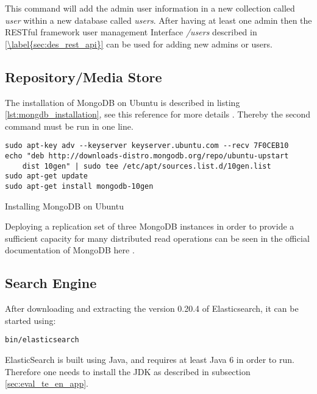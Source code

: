 This command will add the admin user information in a new collection called \textit{user} within a new database called \textit{users}.  After having at least one admin then the RESTful framework user management Interface \textit{/users} described in \ref{\label{sec:des_rest_api}} can be used for adding new admins or users.

\subsection{Repository/Media Store\label{sec:eval_te_en_mongo}}
The installation of MongoDB on Ubuntu is described in listing \ref{lst:mongdb_installation}, see this reference for more details \cite{MongoDb:installation}. Thereby the second command must be run in one line.  
\begin{code}
\begin{verbatim}
sudo apt-key adv --keyserver keyserver.ubuntu.com --recv 7F0CEB10
echo "deb http://downloads-distro.mongodb.org/repo/ubuntu-upstart 
	dist 10gen" | sudo tee /etc/apt/sources.list.d/10gen.list
sudo apt-get update
sudo apt-get install mongodb-10gen
\end{verbatim}
\caption{Installing MongoDB on Ubuntu}
\label{lst:mongdb_installation}
\end{code}

Deploying a replication set of three MongoDB instances in order to provide a sufficient capacity for many distributed read operations can be seen in the official documentation of MongoDB here \cite{mongodb_replica_set}.

\subsection{Search Engine\label{sec:eval_te_se}}
After downloading  and extracting the version 0.20.4 of Elasticsearch, it can be started using:
\begin{code}
\begin{verbatim}
bin/elasticsearch
\end{verbatim}
\end{code}

ElasticSearch is built using Java, and requires at least Java 6 in order to run. Therefore one needs to install the \ac{JDK} as described in subsection \ref{sec:eval_te_en_app}.

